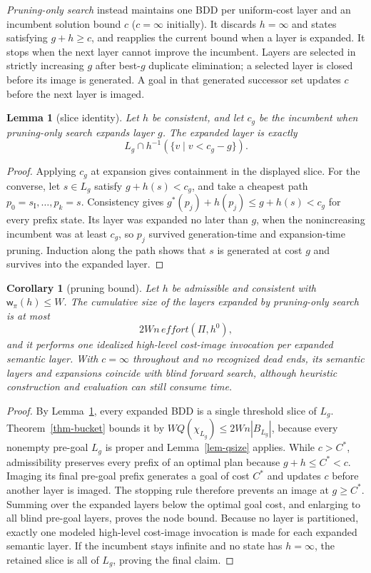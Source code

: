 \documentclass[letterpaper]{article}
\newcommand{\task}{\ensuremath{\Pi}}
\newcommand{\sinit}{\ensuremath{s_{\mathrm{I}}}}
\newcommand{\hblind}{\ensuremath{h^{0}}}
\newcommand{\gstar}{\ensuremath{g^{*}}}
\newcommand{\copt}{\ensuremath{C^{*}}}
\newcommand{\bddsize}[1]{\ensuremath{|B_{#1}|}}
\newcommand{\cofcount}{\ensuremath{Q}}
\newcommand{\width}{\ensuremath{\mathsf{w}}}
\newcommand{\effort}{\ensuremath{\mathit{effort}}}
\theoremstyle{plain}
\newtheorem{lemma}{Lemma}
\newtheorem{corollary}{Corollary}
\theoremstyle{definition}
\theoremstyle{remark}
\begin{document}
\emph{Pruning-only search} instead maintains one BDD per uniform-cost
layer and an incumbent solution bound $c$ ($c=\infty$ initially). It
discards $h=\infty$ and states satisfying $g+h\geq c$, and reapplies the
current bound when a layer is expanded. It stops when the next layer cannot
improve the incumbent. Layers are selected in strictly increasing $g$ after
best-$g$ duplicate elimination; a selected layer is closed before its image is
generated. A goal in that generated successor set updates $c$ before the next
layer is imaged.

\begin{lemma}[slice identity]
\label{lem-slice}
Let $h$ be consistent, and let $c_g$ be the incumbent when pruning-only
search expands layer $g$. The expanded layer is exactly
\[
 L_g\cap h^{-1}(\{v\mid v<c_g-g\}).
\]
\end{lemma}

\begin{proof}
Applying $c_g$ at expansion gives containment in the displayed slice. For
the converse, let $s\in L_g$ satisfy $g+h(s)<c_g$, and take a cheapest
path $p_0=\sinit,\ldots,p_k=s$. Consistency gives
$\gstar(p_j)+h(p_j)\leq g+h(s)<c_g$ for every prefix state. Its layer was
expanded no later than $g$, when the nonincreasing incumbent was at least
$c_g$, so $p_j$ survived generation-time and expansion-time pruning.
Induction along the path shows that $s$ is generated at cost $g$ and
survives into the expanded layer.
\end{proof}

\begin{corollary}[pruning bound]
\label{cor-prune}
Let $h$ be admissible and consistent with $\width_\pi(h)\leq W$. The
cumulative size of the layers expanded by pruning-only search is at most
\[
 2Wn\,\effort(\task,\hblind),
\]
and it performs one idealized high-level cost-image invocation per expanded
semantic layer. With $c=\infty$
throughout and no recognized dead ends, its semantic layers and expansions
coincide with blind forward search, although heuristic construction and
evaluation can still consume time.
\end{corollary}

\begin{proof}
By Lemma~\ref{lem-slice}, every expanded BDD is a single threshold slice
of $L_g$. Theorem~\ref{thm-bucket} bounds it by
$W\cofcount(\chi_{L_g})\leq2Wn\bddsize{L_g}$, because every nonempty
pre-goal $L_g$ is proper and Lemma~\ref{lem-qsize} applies. While
$c>\copt$, admissibility preserves every prefix
of an optimal plan because $g+h\leq\copt<c$. Imaging its final pre-goal prefix
generates a goal of cost $\copt$ and updates $c$ before another layer is
imaged. The stopping rule therefore prevents an image at $g\geq\copt$.
Summing over the expanded layers below the optimal goal cost, and enlarging
to all blind pre-goal layers, proves the node bound. Because no layer is
partitioned, exactly one modeled high-level cost-image invocation is made for
each expanded semantic layer. If the incumbent stays infinite and no state
has $h=\infty$, the retained slice
is all of $L_g$, proving the final claim.
\end{proof}
\end{document}
